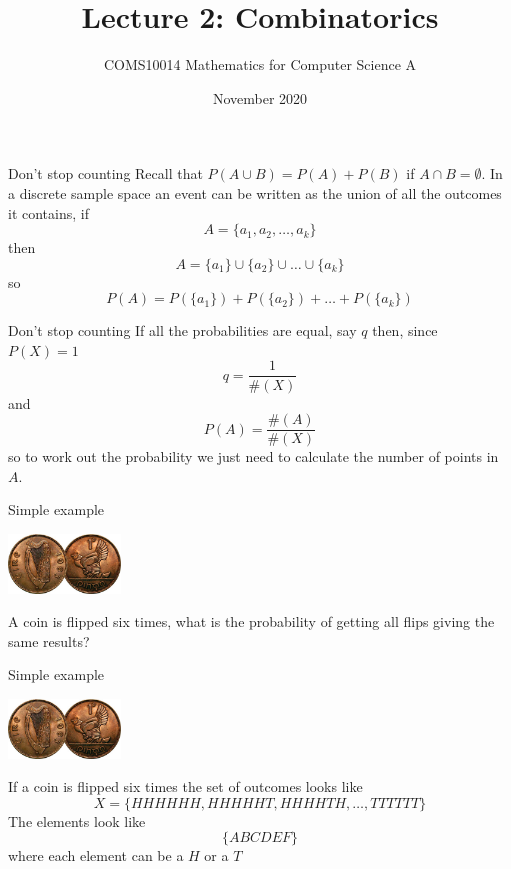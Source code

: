 \documentclass{beamer}
\title{Lecture 2: Combinatorics}
\author{COMS10014 Mathematics for Computer Science A}
\institute{\texttt{cs-uob.github.io/COMS10014/ and github.com/coms10011/2020\_21}}
\date{November 2020}
\newcommand{\crish}{\color{reddish}}
\newcommand{\cbla}{\color{black}}
\newcommand{\cblu}{\color{blue}}
\newcommand{\cgre}{\color{green}}
\begin{document}
\maketitle
\begin{frame}{Don't stop counting}
  Recall that \crish$P(A\cup B)=P(A)+P(B)$\cbla{}  if \crish$A\cap B=\emptyset$\cbla{}. In a discrete sample space an event can be written as the union of all the outcomes it contains, if \crish$$A=\{a_1,a_2,\ldots,a_k\}$$\cbla{}then
  \crish$$A=\{a_1\}\cup\{a_2\}\cup\ldots\cup\{a_k\}$$\cbla{}
  so
  \crish$$
  P(A)=P(\{a_1\})+P(\{a_2\})+\ldots+P(\{a_k\})  
  $$\cbla{}
\end{frame}

\begin{frame}{Don't stop counting}
  If all the probabilities are equal, say \crish$q$\cbla{} then, since \crish$P(X)=1$\cbla{}
  \crish$$
  q=\frac{1}{\#(X)}
  $$\cbla{}
  and
  \crish$$
  P(A)=\frac{\#(A)}{\#(X)}
  $$\cbla{}
  so to work out the probability we just need to calculate the number of points in \crish$A$\cbla{}.
\end{frame}

\begin{frame}{Simple example}
    \begin{center}
    \includegraphics[width=3cm]{1d.jpg}
    \end{center}
A coin is flipped six times, what is the probability of getting all flips giving the same results? 
\end{frame}


\begin{frame}{Simple example}
    \begin{center}
    \includegraphics[width=3cm]{1d.jpg}
    \end{center}
    If a coin is flipped six times the set of outcomes looks like
    \crish$$X=\{HHHHHH,HHHHHT,HHHHTH,\ldots,TTTTTT\}$$\cbla{}
    The elements look like
    \crish$$\{ABCDEF\}$$\cbla{}
    where each element can be a \cblu$H$\cbla{} or a \cgre$T$\cbla{}
\end{frame}
\end{document}
